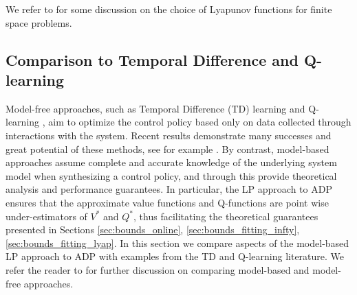 \documentclass[journal]{IEEEtran}
\newcommand{\textQ}{Q}
\begin{document}
We refer to \cite[\S 5]{vanRoy_linApproxDP} for some discussion on the choice of Lyapunov functions for finite space problems.
















\subsection{Comparison to Temporal Difference and \textQ-learning} \label{sec:unify:qlearning_comparison}


Model-free approaches, such as Temporal Difference (TD) learning \cite{sutton_1988_TDlearning} and \textQ-learning \cite{watkins_1989_learningFromDelayedRewards}, aim to optimize the control policy based only on data collected through interactions with the system.
Recent results demonstrate many successes and great potential of these methods, see for example \cite{reviewer_suggestion_2016_modelfree,google_2015_atari,reviewer_suggestion_2018_Qlearning_experience_replay,meyn_2017_zap_qlearning,reviewer_suggestion_2017_policy_gradient,google_2017_alphago}.
By contrast, model-based approaches assume complete and accurate knowledge of the underlying system model when synthesizing a control policy, and through this provide theoretical analysis and performance guarantees.
In particular, the LP approach to ADP ensures that the approximate value functions and \textQ-functions are point wise under-estimators of $V^\ast$ and $Q^\ast$, thus facilitating the theoretical guarantees presented in Sections \ref{sec:bounds_online}, \ref{sec:bounds_fitting_infty}, \ref{sec:bounds_fitting_lyap}.
In this section we compare aspects of the model-based LP approach to ADP with examples from the TD and \textQ-learning literature.
We refer the reader to \cite[Chapter 8]{sutton_2018_rlbook} for further discussion on comparing model-based and model-free approaches.
\end{document}
